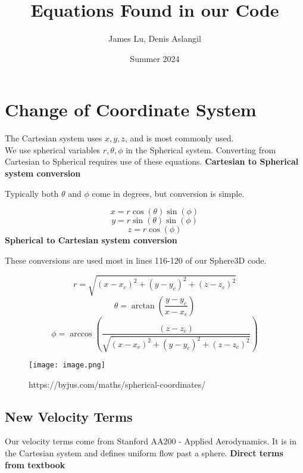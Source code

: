 \documentclass{article}
\title{Equations Found in our Code}
\author{James Lu, Denis Aslangil}
\date{Summer 2024}
\begin{document}
\begin{center}
\maketitle
\section*{Change of Coordinate System}
\setcounter{page}{1}
\begin{Large}
The Cartesian system uses \(x, y, z\), and is most commonly used.\\
We use spherical variables \(r, \theta, \phi\) in the Spherical system. 
Converting from Cartesian to Spherical requires use of these equations.
\bigbreak
\textbf{Cartesian to Spherical system conversion}

\begin{small} Typically both $\theta$ and $\phi$ come in degrees, but conversion is simple. \end{small}
\[
x = r \cos(\theta) \sin(\phi) 
\]
\[
y = r \sin(\theta) \sin(\phi)
\]
\[
z = r \cos(\phi)
\]
\textbf{Spherical to Cartesian system conversion}

\begin{small}
These conversions are used most in lines 116-120 of our Sphere3D code.
\end{small}
\[
r = \sqrt{(x-x_c)^2 + (y-y_c)^2 + (z-z_c)^2}
\]
\[
\theta = \arctan \left( \frac{y-y_c}{x-x_c} \right)
\]
\[
\phi = \arccos \left( \frac{(z-z_c)}{\sqrt{(x-x_c)^2 + (y-y_c)^2 + (z-z_c)^2}} \right)
\]
\end{Large}


\begin{figure}[h!]
    \centering
    \texttt{[image: image.png]}
    \caption{https://byjus.com/maths/spherical-coordinates/}
    \label{fig:enter-label}
\end{figure}
\pagebreak
\begin{Large}
\section*{New Velocity Terms}
Our velocity terms come from Stanford AA200 - Applied Aerodynamics.
It is in the Cartesian system and defines uniform flow past a sphere.
\bigbreak
\textbf{Direct terms from textbook}


\end{Large}
\end{center}
\end{document}
